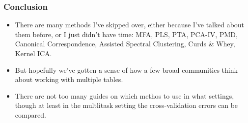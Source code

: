\documentclass[10pt]{beamer}\usepackage[]{graphicx}\usepackage[]{color}
\begin{document}
\begin{frame}
  \frametitle{Conclusion}
  \begin{itemize}
  \item There are many methods I've skipped over, either because I've talked
    about them before, or I just didn't have time: MFA, PLS, PTA, PCA-IV, PMD,
    Canonical Correspondence, Assisted Spectral Clustering, Curds \& Whey, Kernel ICA.
  \item But hopefully we've gotten a sense of how a few broad communities think
    about working with multiple tables.
  \item There are not too many guides on which methos to use in
    what settings, though at least in the multlitask setting the
    cross-validation errors can be compared.
  \end{itemize}
\end{frame}



\end{document}
